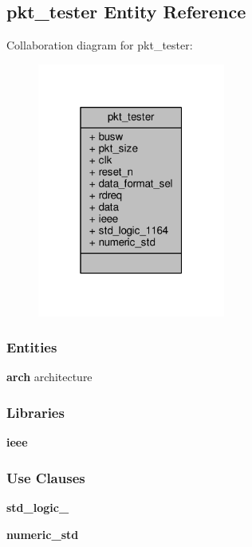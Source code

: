 \subsection{pkt\+\_\+tester Entity Reference}
\label{classpkt__tester}


Collaboration diagram for pkt\+\_\+tester\+:\nopagebreak
\begin{figure}[H]
\begin{center}
\leavevmode
\includegraphics[width=175pt]{d7/d22/classpkt__tester__coll__graph}
\end{center}
\end{figure}
\subsubsection*{Entities}
\begin{DoxyCompactItemize}
\item 
{\bf arch} architecture
\end{DoxyCompactItemize}
\subsubsection*{Libraries}
 \begin{DoxyCompactItemize}
\item 
{\bf ieee} 
\end{DoxyCompactItemize}
\subsubsection*{Use Clauses}
 \begin{DoxyCompactItemize}
\item 
{\bf std\+\_\+logic\+\_}   
\item 
{\bf numeric\+\_\+std}   
\end{DoxyCompactItemize}
